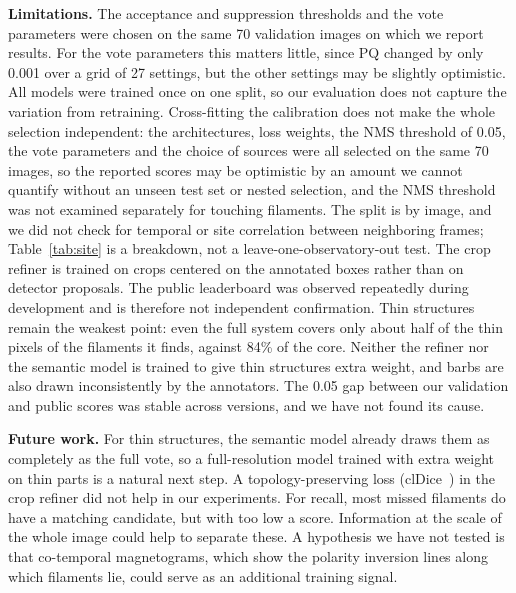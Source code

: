\documentclass[conference]{IEEEtran}
\begin{document}
\textbf{Limitations.} The acceptance and suppression thresholds and the vote parameters were chosen on the same 70 validation images on which we report results. For the vote parameters this matters little, since PQ changed by only 0.001 over a grid of 27 settings, but the other settings may be slightly optimistic. All models were trained once on one split, so our evaluation does not capture the variation from retraining. Cross-fitting the calibration does not make the whole selection independent: the architectures, loss weights, the NMS threshold of 0.05, the vote parameters and the choice of sources were all selected on the same 70 images, so the reported scores may be optimistic by an amount we cannot quantify without an unseen test set or nested selection, and the NMS threshold was not examined separately for touching filaments. The split is by image, and we did not check for temporal or site correlation between neighboring frames; Table~\ref{tab:site} is a breakdown, not a leave-one-observatory-out test. The crop refiner is trained on crops centered on the annotated boxes rather than on detector proposals. The public leaderboard was observed repeatedly during development and is therefore not independent confirmation. Thin structures remain the weakest point: even the full system covers only about half of the thin pixels of the filaments it finds, against 84\% of the core. Neither the refiner nor the semantic model is trained to give thin structures extra weight, and barbs are also drawn inconsistently by the annotators. The 0.05 gap between our validation and public scores was stable across versions, and we have not found its cause.

\textbf{Future work.} For thin structures, the semantic model already draws them as completely as the full vote, so a full-resolution model trained with extra weight on thin parts is a natural next step. A topology-preserving loss (clDice~\cite{shit2021cldice}) in the crop refiner did not help in our experiments. For recall, most missed filaments do have a matching candidate, but with too low a score. Information at the scale of the whole image could help to separate these. A hypothesis we have not tested is that co-temporal magnetograms, which show the polarity inversion lines along which filaments lie, could serve as an additional training signal.
\end{document}
